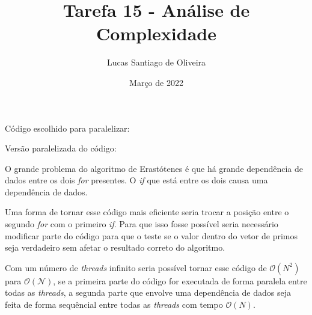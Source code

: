 \documentclass{article}
\title{Tarefa 15 - Análise de Complexidade}
\author{Lucas Santiago de Oliveira}
\date{Março de 2022}
\begin{document}
\maketitle

\vspace{2cm}

Código escolhido para paralelizar:


Versão paralelizada do código:


O grande problema do algoritmo de Erastótenes é que há grande dependência
de dados entre os dois \emph{for} presentes. O \emph{if} que está entre
os dois causa uma dependência de dados.  

Uma forma de tornar esse código mais eficiente seria trocar a posição entre 
o segundo \emph{for} com o primeiro \emph{if}. Para que isso fosse possível
seria necessário modificar parte do código para que o teste se o valor dentro
do vetor de primos seja verdadeiro sem afetar o resultado correto do algoritmo.

Com um número de \emph{threads} infinito seria possível tornar esse código
de $\mathcal{O}(N^2)$ para $\mathcal{O(N)}$, se a primeira parte do código
for executada de forma paralela entre todas as \emph{threads}, a segunda
parte que envolve uma dependência de dados seja feita de forma sequêncial
entre todas as \emph{threads} com tempo $\mathcal{O}(N)$.
 
\end{document}
